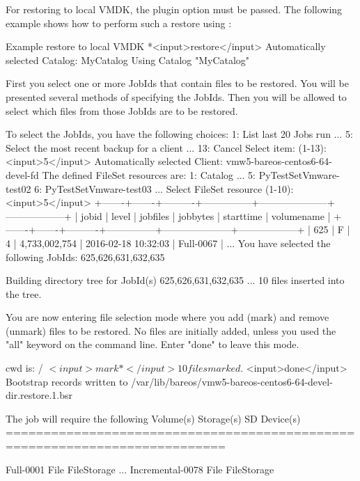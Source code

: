 For restoring to local VMDK, the plugin option  must be passed.
The following example shows how to perform such a restore using :

\begin{commands}{Example restore to local VMDK}
*<input>restore</input>
Automatically selected Catalog: MyCatalog
Using Catalog "MyCatalog"

First you select one or more JobIds that contain files
to be restored. You will be presented several methods
of specifying the JobIds. Then you will be allowed to
select which files from those JobIds are to be restored.

To select the JobIds, you have the following choices:
     1: List last 20 Jobs run
     ...
     5: Select the most recent backup for a client
     ...
    13: Cancel
Select item:  (1-13): <input>5</input>
Automatically selected Client: vmw5-bareos-centos6-64-devel-fd
The defined FileSet resources are:
     1: Catalog
     ...
     5: PyTestSetVmware-test02
     6: PyTestSetVmware-test03
     ...
Select FileSet resource (1-10): <input>5</input>
+-------+-------+----------+---------------+---------------------+------------------+
| jobid | level | jobfiles | jobbytes      | starttime           | volumename       |
+-------+-------+----------+---------------+---------------------+------------------+
|   625 | F     |        4 | 4,733,002,754 | 2016-02-18 10:32:03 | Full-0067        |
...
You have selected the following JobIds: 625,626,631,632,635

Building directory tree for JobId(s) 625,626,631,632,635 ...  
10 files inserted into the tree.

You are now entering file selection mode where you add (mark) and
remove (unmark) files to be restored. No files are initially added, unless
you used the "all" keyword on the command line.
Enter "done" to leave this mode.

cwd is: /
$ <input>mark *</input>
10 files marked.
$ <input>done</input>
Bootstrap records written to /var/lib/bareos/vmw5-bareos-centos6-64-devel-dir.restore.1.bsr

The job will require the following
   Volume(s)                 Storage(s)                SD Device(s)
===========================================================================
   
    Full-0001                 File                      FileStorage
    ...
    Incremental-0078          File                      FileStorage


\end{commands}
